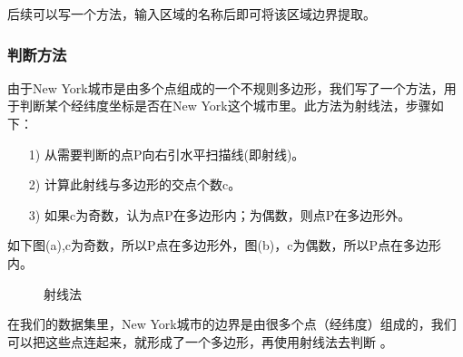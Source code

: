 后续可以写一个方法，输入区域的名称后即可将该区域边界提取。

\subsubsection{判断方法}
由于New York城市是由多个点组成的一个不规则多边形，我们写了一个方法，用于判断某个经纬度坐标是否在New York这个城市里。此方法为射线法，步骤如下：
\begin{itemize}
\item[1)]从需要判断的点P向右引水平扫描线(即射线)。
\item[2)]计算此射线与多边形的交点个数c。
\item[3)]如果c为奇数，认为点P在多边形内；为偶数，则点P在多边形外。
\end{itemize}
如下图(a),c为奇数，所以P点在多边形外，图(b)，c为偶数，所以P点在多边形内。


\begin{figure}[htbp]
\centering
{}
\quad
{}

\caption{射线法}
\end{figure}

在我们的数据集里，New York城市的边界是由很多个点（经纬度）组成的，我们可以把这些点连起来，就形成了一个多边形，再使用射线法去判断
。

